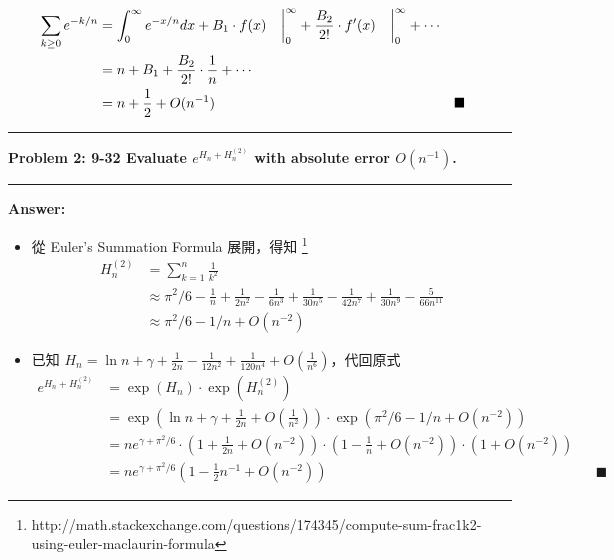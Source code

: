 \documentclass[11pt,fleqn]{article}
\newcommand\question[2]{\vspace{.25in}\hrule\textbf{#1: #2}\vspace{.5em}\hrule\vspace{.10in}}
\renewcommand\part[1]{\vspace{.10in}\textbf{#1}}
\begin{document}
\begin{align*}
\sum_{k \ge 0} e^{-k/n} 
	&= \int^{\infty}_{0} e^{-x/n} dx + B_1 \cdot f(x) 
			\left.\phantom{0\over0} \right|^{\infty}_{0} + 
		\frac{B_2}{2!} \cdot f'(x) 
			\left.\phantom{0\over0} \right|^{\infty}_{0} + \cdots
			\\
	&= n + B_1 + \frac{B_2}{2!} \cdot \frac{1}{n} + \cdots \\
	&= n + \frac{1}{2} + O(n^{-1}) && \blacksquare
\end{align*}

\newpage

\question{Problem 2} {9-32 Evaluate $e^{H_n + H^{(2)}_n}$ with absolute error $O(n^{-1})$.
}

\part{Answer:}

\begin{itemize}
	\item 從 Euler's Summation Formula 展開，得知 \footnote{http://math.stackexchange.com/questions/174345/compute-sum-frac1k2-using-euler-maclaurin-formula}	
		\begin{align*}
			H_n^{(2)} &= \sum_{k=1}^{n} \frac{1}{k^2} \\
			 	&\approx
					\pi^2/6 - \frac{1}{n} + \frac{1}{2n^2} - \frac{1}{6n^3} 
						+ \frac{1}{30n^5} - \frac{1}{42n^7} + \frac{1}{30n^9} 
							- \frac{5}{66n^{11}} \\
				&\approx
					\pi^2/6 - 1/n + O(n^{-2})
		\end{align*}
	\item 已知 $H_n = \ln n + \gamma + \frac{1}{2n} - \frac{1}{12n^2} + \frac{1}{120n^4} + O(\frac{1}{n^6})$，代回原式
		\begin{align*}
			e^{H_n + H^{(2)}_n} 
				&= \exp(H_n) \cdot \exp(H^{(2)}_n) \\
				&= \exp\left(\ln n + \gamma + \frac{1}{2n} + O(\frac{1}{n^2})\right)
					\cdot \exp\left(\pi^2/6 - 1/n + O(n^{-2})\right) \\
				&= n e^{\gamma + \pi^2/6} \cdot
					\left(1 + \frac{1}{2n} + O(n^{-2})\right) 
					\cdot \left(1 - \frac{1}{n} + O(n^{-2})\right)
					\cdot (1 + O(n^{-2})) \\
				&= n e^{\gamma + \pi^2/6} \left(1 - \frac{1}{2} n^{-1} + O(n^{-2})\right)
					&& \blacksquare
		\end{align*}
\end{itemize}
\end{document}
